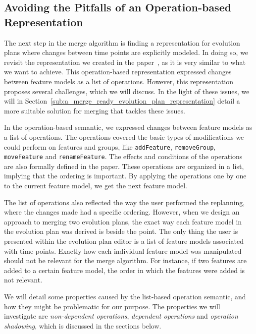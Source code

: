 \documentclass[a4paper,english]{ifimaster}
\begin{document}
\subsection{Avoiding the Pitfalls of an Operation-based Representation}%
\label{sub:avoiding_the_pitfalls_of_an_operation_based_representation}

The next step in the merge algorithm is finding a representation for evolution plans where changes between time points are explicitly modeled. In doing so, we revisit the representation we created in the paper~\cite{cite:consistency_preserving_evolution_planning}, as it is very similar to what we want to achieve. This operation-based representation expressed changes between feature models as a list of operations. However, this representation proposes several challenges, which we will discuss. In the light of these issues, we will in Section~\vref{sub:a_merge_ready_evolution_plan_representation} detail a more suitable solution for merging that tackles these issues.

In the operation-based semantic, we expressed changes between feature models as a list of operations. The operations covered the basic types of modifications we could perform on features and groups, like \texttt{addFeature}, \texttt{removeGroup}, \texttt{moveFeature} and \texttt{renameFeature}. The effects and conditions of the operations are also formally defined in the paper. These operations are organized in a list, implying that the ordering is important. By applying the operations one by one to the current feature model, we get the next feature model.

The list of operations also reflected the way the user performed the replanning, where the changes made had a specific ordering. However, when we design an approach to merging two evolution plans, the exact way each feature model in the evolution plan was derived is beside the point. The only thing the user is presented within the evolution plan editor is a list of feature models associated with time points. Exactly how each individual feature model was manipulated should not be relevant for the merge algorithm. For instance, if two features are added to a certain feature model, the order in which the features were added is not relevant.

We will detail some properties caused by the list-based operation semantic, and how they might be problematic for our purpose. The properties we will investigate are \textit{non-dependent operations}, \textit{dependent operations} and \textit{operation shadowing}, which is discussed in the sections below.
\end{document}
